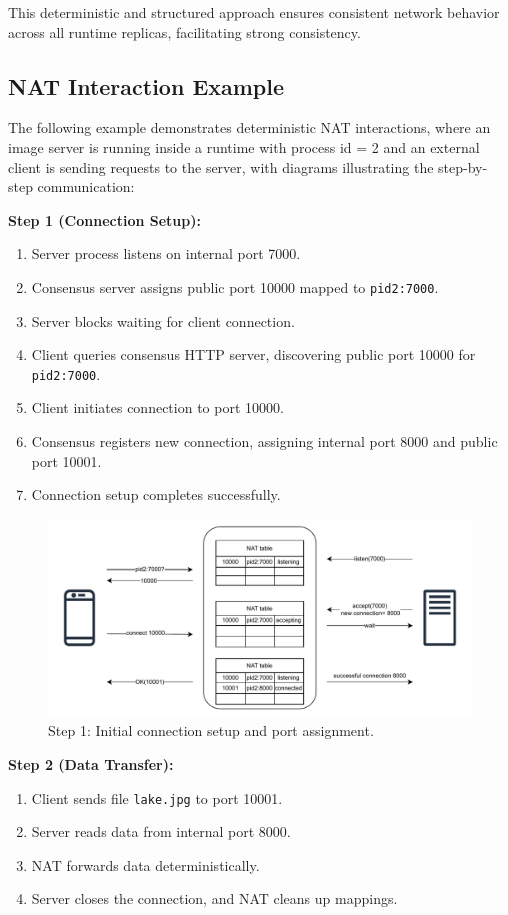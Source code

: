 \documentclass[10pt, 
]{IEEEtran}
\begin{document}
This deterministic and structured approach ensures consistent network behavior across all runtime replicas, facilitating strong consistency.


\subsection{NAT Interaction Example}

The following example demonstrates deterministic NAT interactions, where an image server is running inside a runtime with process id = 2 and an external client is sending requests to the server, with diagrams illustrating the step-by-step communication:

\textbf{Step 1 (Connection Setup):}
\begin{enumerate}
\item Server process listens on internal port 7000.
\item Consensus server assigns public port 10000 mapped to \texttt{pid2:7000}.
\item Server blocks waiting for client connection.
\item Client queries consensus HTTP server, discovering public port 10000 for \texttt{pid2:7000}.
\item Client initiates connection to port 10000.
\item Consensus registers new connection, assigning internal port 8000 and public port 10001.
\item Connection setup completes successfully.
\end{enumerate}

\begin{figure}[h]
\centering
\includegraphics[width=0.9\linewidth]{consensus_diagram_1.pdf}
\caption{Step 1: Initial connection setup and port assignment.}
\label{fig:consensus-1}
\end{figure}

\textbf{Step 2 (Data Transfer):}
\begin{enumerate}
\item Client sends file \texttt{lake.jpg} to port 10001.
\item Server reads data from internal port 8000.
\item NAT forwards data deterministically.
\item Server closes the connection, and NAT cleans up mappings.
\end{enumerate}
\end{document}
